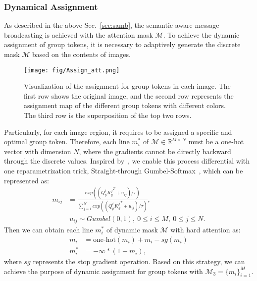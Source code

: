 \documentclass[journal]{IEEEtran}
\begin{document}
\subsubsection{Dynamical Assignment} 
\label{sec:da}
As described in the above Sec.~\ref{sec:samb}, the semantic-aware message broadcasting is achieved with the attention mask $\mathcal{M}$. To achieve the dynamic assignment of group tokens, it is necessary to adaptively generate the discrete mask $\mathcal{M}$ based on the contents of images.
\begin{figure*}[htp]
    \centering
    \texttt{[image: fig/Assign\_att.png]}
    \caption{Visualization of the assignment for group tokens in each image. The first row shows the original image, and the second row represents the assignment map of the different group tokens with different colors. The third row is the superposition of the top two rows.}  
    \label{fig:region_assignment}
\end{figure*}
Particularly, for each image region, it requires to be assigned a specific and optimal group token. Therefore, each line $m_i^*$ of $\mathcal{M}\in \mathbb{R}^{M\times N}$  must be a one-hot vector with dimension $N$, where the gradients cannot be directly backward through the discrete values. Inspired by~\cite{xu2022groupvit, van2017neuralVQVAE, jang2016categoricalGumbelsoftmax}, we enable this process differential with one reparametrization trick, Straight-through Gumbel-Softmax~\cite{jang2016categoricalGumbelsoftmax}, which can be represented as:
\begin{equation}
\begin{split}
      m_{ij} &= \frac{exp((Q_p^i {K_g^j}^T + u_{ij})/\tau)}{\sum_{j=1}^N exp((Q_p^i {K_g^j}^T+u_{ij})/\tau)}, \\ 
       &~ u_{ij} \sim Gumbel(0, 1), ~ 0\le i \le M, ~ 0 \le j \le N. 
\end{split}
\end{equation}
Then we can obtain each line $m_i^*$ of dynamic mask $\mathcal{M}$ with hard attention as:
\begin{equation}
\begin{split}
     m_i &= \mathrm{one}\mbox{-}\mathrm{hot}(m_i) + m_i - sg(m_i) \\
     m_i^* &= -\infty * (1-m_i),
\end{split}
\end{equation}
where $sg$ represents the stop gradient operation. Based on this strategy, we can achieve the purpose of dynamic assignment for group tokens with $\mathcal{M}_3=\{m_i\}_{i=1}^{M}$. 
\end{document}
